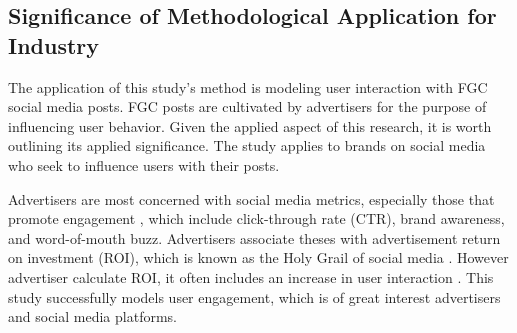 \documentclass{article}
\begin{document}
\subsection{Significance of Methodological Application for Industry}

The application of this study's method is modeling user interaction with FGC social media posts. FGC posts are cultivated by advertisers for the purpose of influencing user behavior. Given the applied aspect of this research, it is worth outlining its applied significance. The study applies to brands on social media who seek to influence users with their posts.

Advertisers are most concerned with social media metrics, especially those that promote engagement \cite{Tiago2014}, which include click-through rate (CTR), brand awareness, and word-of-mouth buzz. Advertisers associate theses with advertisement return on investment (ROI), which is known as the Holy Grail of social media \cite{Fisher2009}. However advertiser calculate ROI, it often includes an increase in user interaction \cite{Romero2011, Schacht}. This study successfully models user engagement, which is of great interest advertisers and social media platforms.  


\end{document}
